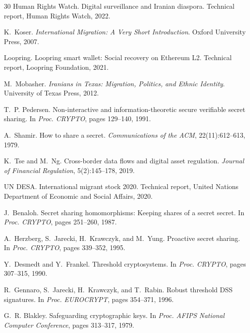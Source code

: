 \documentclass[11pt,a4paper,twocolumn]{article}
\begin{document}
\begin{thebibliography}{30}
{Human Rights Watch}.
\newblock Digital surveillance and Iranian diaspora.
\newblock Technical report, Human Rights Watch, 2022.

K.~Koser.
\newblock \emph{International Migration: A Very Short Introduction}.
\newblock Oxford University Press, 2007.

{Loopring}.
\newblock Loopring smart wallet: Social recovery on Ethereum L2.
\newblock Technical report, Loopring Foundation, 2021.

M.~Mobasher.
\newblock \emph{Iranians in Texas: Migration, Politics, and Ethnic Identity}.
\newblock University of Texas Press, 2012.

T.~P. Pedersen.
\newblock Non-interactive and information-theoretic secure verifiable secret sharing.
\newblock In \emph{Proc. CRYPTO}, pages 129--140, 1991.

A.~Shamir.
\newblock How to share a secret.
\newblock \emph{Communications of the ACM}, 22(11):612--613, 1979.

K.~Tse and M.~Ng.
\newblock Cross-border data flows and digital asset regulation.
\newblock \emph{Journal of Financial Regulation}, 5(2):145--178, 2019.

{UN DESA}.
\newblock International migrant stock 2020.
\newblock Technical report, United Nations Department of Economic and Social Affairs, 2020.

J.~Benaloh.
\newblock Secret sharing homomorphisms: Keeping shares of a secret secret.
\newblock In \emph{Proc. CRYPTO}, pages 251--260, 1987.

A.~Herzberg, S.~Jarecki, H.~Krawczyk, and M.~Yung.
\newblock Proactive secret sharing.
\newblock In \emph{Proc. CRYPTO}, pages 339--352, 1995.

Y.~Desmedt and Y.~Frankel.
\newblock Threshold cryptosystems.
\newblock In \emph{Proc. CRYPTO}, pages 307--315, 1990.

R.~Gennaro, S.~Jarecki, H.~Krawczyk, and T.~Rabin.
\newblock Robust threshold DSS signatures.
\newblock In \emph{Proc. EUROCRYPT}, pages 354--371, 1996.

G.~R. Blakley.
\newblock Safeguarding cryptographic keys.
\newblock In \emph{Proc. AFIPS National Computer Conference}, pages 313--317, 1979.


\end{thebibliography}
\end{document}
